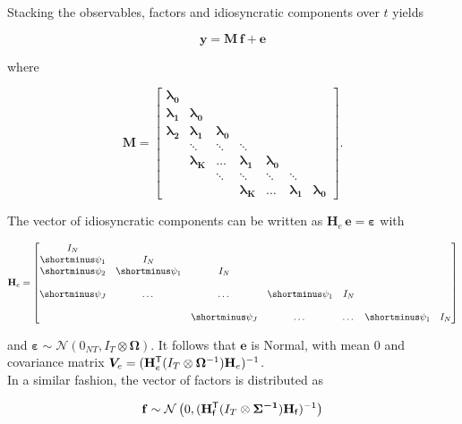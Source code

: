 \documentclass[notitlepage,a4paper,12pt]{article}
\newcommand{\transpose}[1]{{#1}^{\sf{T}}}
\begin{document}
Stacking the observables, factors and idiosyncratic components over $t$ yields 

\begin{equation}
    \mathbf{y} = \mathbf{M} \, \mathbf{f} + \mathbf{e}
\end{equation} 

\noindent where 

$$
\mathbf{M}
=
\begin{bmatrix}
    \boldsymbol{\lambda_0} &   \\
    \boldsymbol{\lambda_1} & \boldsymbol{\lambda_0}   \\
    \boldsymbol{\lambda_2} & \boldsymbol{\lambda_1} & \boldsymbol{\lambda_0} \\
     & \ddots & \ddots & \ddots \\
     & \boldsymbol{\lambda_K} &\dots & \boldsymbol{\lambda_1} & \boldsymbol{\lambda_0}
     &  \\
     & & \ddots & \ddots & \ddots & \ddots \\
    & & & \boldsymbol{\lambda_K} &\dots & \boldsymbol{\lambda_1} & \boldsymbol{\lambda_0}
\end{bmatrix}.
$$

The vector of idiosyncratic components can be written as $\mathbf{H}_e\, \mathbf{e} = \boldsymbol{\varepsilon}$ with 

$$
\mathbf{H}_e
=
\begin{bmatrix}
    I_N &  \\
    \shortminus \psi_1 & I_N &  \\
    \shortminus \psi_2 & \shortminus \psi_1 & I_N &  \\
     &  &  &  &  & \\
    \shortminus \psi_J & \dots & \dots & \shortminus \psi_1 & I_N \\
     &  &  &  &  & \\
    & & \shortminus \psi_J & \dots & \dots & \shortminus \psi_1 & I_N
\end{bmatrix}
$$

\noindent and $\boldsymbol{\varepsilon} \sim \mathcal{N}(0_{NT}, I_T \otimes \boldsymbol{\Omega})$. It follows that $\mathbf{e}$ is Normal, with mean $0$ and covariance matrix $\bm{V}_{e} = (\transpose{\mathbf{H}}_{e} (I_T \otimes \boldsymbol{\Omega}^{-1}) \mathbf{H}_e)^{-1}$. \\

In a similar fashion, the vector of factors is distributed as 

$$
\mathbf{f} \sim \mathcal{N}\left(0, (\transpose{\mathbf{H}}_{\sf{f}} (I_T \otimes \boldsymbol{\Sigma^{-1}}) \mathbf{H}_{\sf{f}})^{-1}\right)
$$
\end{document}
